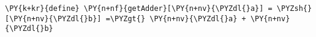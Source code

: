\begin{Verbatim}[commandchars=\\\{\}]
\PY{k+kr}{define} \PY{n+nf}{getAdder}[\PY{n+nv}{\PYZdl{}a}] = \PYZsh{}[\PY{n+nv}{\PYZdl{}b}] =\PYZgt{} \PY{n+nv}{\PYZdl{}a} + \PY{n+nv}{\PYZdl{}b}
\end{Verbatim}
